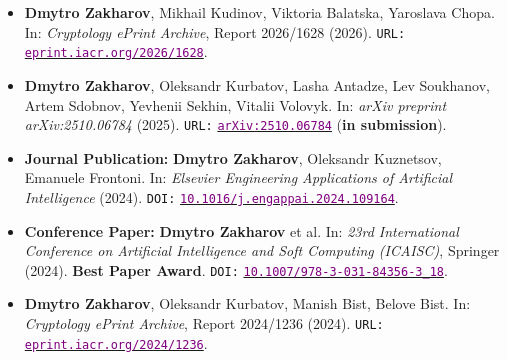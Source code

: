 \documentclass[10pt,a4paper,ragged2e]{maltacv}
\begin{document}

\begin{itemize}
  \item \textbf{Dmytro Zakharov}, Mikhail Kudinov, Viktoria Balatska, Yaroslava Chopa. In: \textit{Cryptology ePrint Archive}, Report 2026/1628 (2026). \texttt{URL:} \href{https://eprint.iacr.org/2026/1628.pdf}{\textcolor{purple}{\texttt{eprint.iacr.org/2026/1628}}}.
\end{itemize}

\begin{itemize}
  \item \textbf{Dmytro Zakharov}, Oleksandr Kurbatov, Lasha Antadze, Lev Soukhanov, Artem Sdobnov, Yevhenii Sekhin, Vitalii Volovyk. In: \textit{arXiv preprint arXiv:2510.06784} (2025). \texttt{URL:} \href{https://arxiv.org/abs/2510.06784}{\textcolor{purple}{\texttt{arXiv:2510.06784}}} (\textbf{in submission}).
\end{itemize}

\begin{itemize}
  \item \textbf{Journal Publication:} \textbf{Dmytro Zakharov}, Oleksandr Kuznetsov, Emanuele Frontoni. In: \textit{Elsevier Engineering Applications of Artificial Intelligence} (2024). \texttt{DOI:} \href{https://doi.org/10.1016/j.engappai.2024.109164}{\textcolor{purple}{\texttt{10.1016/j.engappai.2024.109164}}}.
  \item \textbf{Conference Paper:} \textbf{Dmytro Zakharov} et al. In: \textit{23rd International Conference on Artificial Intelligence and Soft Computing (ICAISC)}, Springer (2024). \textbf{\textcolor{green!60!black}{Best Paper Award}}. \texttt{DOI:} \href{https://doi.org/10.1007/978-3-031-84356-3_18}{\textcolor{purple}{\texttt{10.1007/978-3-031-84356-3\_18}}}.
\end{itemize}

\begin{itemize}
  \item \textbf{Dmytro Zakharov}, Oleksandr Kurbatov, Manish Bist, Belove Bist. In: \textit{Cryptology ePrint Archive}, Report 2024/1236 (2024). \texttt{URL:} \href{https://eprint.iacr.org/2024/1236}{\textcolor{purple}{\texttt{eprint.iacr.org/2024/1236}}}.
\end{itemize}
\end{document}
